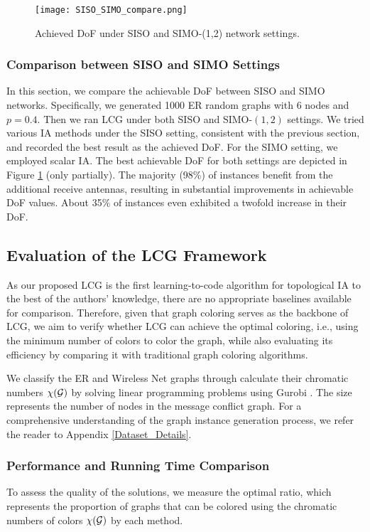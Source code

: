 \documentclass[a4paper,journal]{IEEEtran}
\begin{document}
\begin{figure}[htbp]
	\begin{center}
 \texttt{[image: SISO\_SIMO\_compare.png]}
	\end{center}
	\caption{Achieved DoF under SISO and SIMO-(1,2) network settings.}
	\label{SISO_SIMO_compare}
\end{figure}

\subsubsection{Comparison between SISO and SIMO Settings}
In this section, we compare the achievable DoF between SISO and SIMO networks. Specifically, we generated 1000 ER random graphs with 6 nodes and $p=0.4$. Then we ran LCG under both SISO and SIMO-$(1,2)$ settings. We tried various IA methods under the SISO setting, consistent with the previous section, and recorded the best result as the achieved DoF. For the SIMO setting, we employed scalar IA. The best achievable DoF for both settings are depicted in Figure \ref{SISO_SIMO_compare} (only partially). 
The majority (98\%) of instances benefit from the additional receive antennas, resulting in substantial improvements in achievable DoF values. About 35\% of instances even exhibited a twofold increase in their DoF.

\subsection{Evaluation of the LCG Framework}
As our proposed LCG is the first learning-to-code algorithm for topological IA to the best of the authors' knowledge, there are no appropriate baselines available for comparison. Therefore, given that graph coloring serves as the backbone of LCG, 
{we aim to verify whether LCG can achieve the optimal coloring, i.e., using the minimum number of colors to color the graph, while also evaluating its efficiency by comparing it with traditional graph coloring algorithms.}



{We classify the ER and Wireless Net graphs through calculate their chromatic numbers $\chi({\mathcal{G}})$ by solving linear programming problems using Gurobi \cite{gurobi}. The size represents the number of nodes in the message conflict graph. For a comprehensive understanding of the graph instance generation process, we refer the reader to Appendix \ref{Dataset_Details}.}


\subsubsection{Performance and Running Time Comparison}
To assess the quality of the solutions, we measure the optimal ratio, which represents the proportion of graphs that can be colored using the chromatic numbers of colors $\chi({\mathcal{G}})$ by each method.
\end{document}

